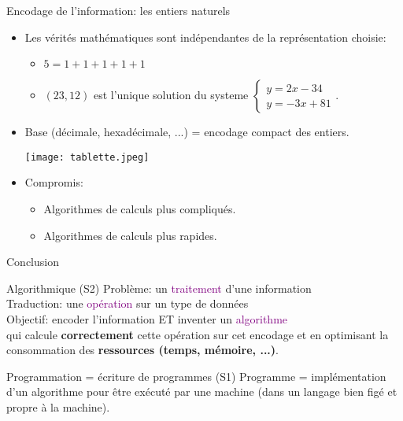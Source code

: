 \documentclass[10pt]{beamer}
\begin{document}
\begin{frame}{Encodage de l'information: les entiers naturels}


  \begin{itemize}
  \item Les v\'erit\'es math\'ematiques sont ind\'ependantes de la repr\'esentation choisie:
    \begin{itemize}
\item $5 = 1 + 1 + 1 + 1 + 1$
\item
      $(23,12)$ est l'unique solution du systeme
      $\left\{ \begin{array}{c} y = 2x - 34 \\ y = -3x + 81 \end{array}\right.$.
\end{itemize}

\pause
  \item Base (d\'ecimale, hexad\'ecimale, ...) = encodage compact des entiers.

      \begin{center}
      \texttt{[image: tablette.jpeg]}
      \end{center}
\pause
    \item Compromis:
      \begin{itemize}
      \item Algorithmes de calculs plus compliqu\'es.
      \item Algorithmes de calculs plus rapides. 
      \end{itemize}
      
  \end{itemize}

\end{frame}



\begin{frame}{Conclusion}

  \begin{block}{Algorithmique (S2)}
    Probl\`eme: un \textcolor{purple}{traitement} d'une \textcolor{dkgreen}{information} \\
    Traduction: une \textcolor{purple}{op\'eration} sur un \textcolor{dkgreen}{type de donn\'ees} \\
    \vspace{0.5cm}
    Objectif: encoder l'\textcolor{dkgreen}{information} ET inventer un \textcolor{purple}{algorithme} \\
    qui calcule \textbf{correctement} cette op\'eration sur cet encodage et en optimisant la consommation des \textbf{ressources (temps, m\'emoire, ...)}.
  \end{block}

\vspace{0.5cm}
  \pause

  \begin{block}{Programmation = \'ecriture de programmes (S1)}
    Programme = impl\'ementation d'un algorithme pour \^etre ex\'ecut\'e par une machine (dans un langage bien fig\'e et propre \`a la machine).
    \end{block}

  
\end{frame}
\end{document}
